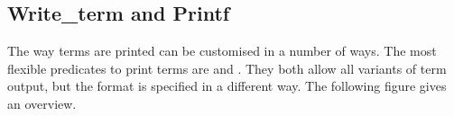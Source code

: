 \subsection{Write_term and Printf}

The way {\eclipse} terms are printed can be customised in a number of ways.
The most flexible predicates to print terms are
and
.
They both allow all variants of term output, but the format is
specified in a different way.
The following figure gives an overview.
\vfill %

\newlength{\WidthOne}
\newlength{\WidthTwo}
\newlength{\WidthThree}\setlength{\WidthThree}{\textwidth}%
\addtolength{\WidthThree}{-\WidthOne}%
\addtolength{\WidthThree}{-\WidthTwo}%

